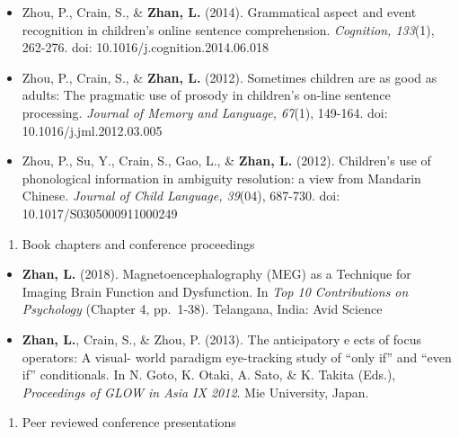 \documentclass[12pt,]{article}
\providecommand{\tightlist}{%
  \setlength{\itemsep}{0pt}\setlength{\parskip}{0pt}}
\begin{document}
\begin{itemize}
{  26}(7), 367-379. doi: 10.1080/20445911.2015.1016527
  \href{https://publications.likan.info/Periodicals/JCognPsychol2015.pdf}{
  \faFilePdf[regular] }
\item
  Zhou, P., Crain, S., \& \textbf{Zhan, L.} (2014). Grammatical aspect
  and event recognition in children's online sentence comprehension.
  \emph{Cognition, 133}(1), 262-276. doi:
  10.1016/j.cognition.2014.06.018
  \href{http://publications.likan.info/Periodicals/Cognition2014.pdf}{
  \faFilePdf[regular] }
\item
  Zhou, P., Crain, S., \& \textbf{Zhan, L.} (2012). Sometimes children
  are as good as adults: The pragmatic use of prosody in children's
  on-line sentence processing. \emph{Journal of Memory and Language,
  67}(1), 149-164. doi: 10.1016/j.jml.2012.03.005
  \href{https://publications.likan.info/Periodicals/JMemLang2012.pdf}{
  \faFilePdf[regular] }
\item
  Zhou, P., Su, Y., Crain, S., Gao, L., \& \textbf{Zhan, L.} (2012).
  Children's use of phonological information in ambiguity resolution: a
  view from Mandarin Chinese. \emph{Journal of Child Language, 39}(04),
  687-730. doi: 10.1017/S0305000911000249
  \href{https://publications.likan.info/Periodicals/JChildLang2012.pdf}{
  \faFilePdf[regular] }
\end{itemize}

\begin{enumerate}
\def\labelenumi{\arabic{enumi}.}
\setcounter{enumi}{2}
\tightlist
\item
  Book chapters and conference proceedings
\end{enumerate}

\begin{itemize}
\item
  \textbf{Zhan, L.} (2018). Magnetoencephalography (MEG) as a Technique
  for Imaging Brain Function and Dysfunction. In \emph{Top 10
  Contributions on Psychology} (Chapter 4, pp.~1-38). Telangana, India:
  Avid Science
\item
  \textbf{Zhan, L.}, Crain, S., \& Zhou, P. (2013). The anticipatory e
  ects of focus operators: A visual- world paradigm eye-tracking study
  of ``only if'' and ``even if'' conditionals. In N. Goto, K. Otaki, A.
  Sato, \& K. Takita (Eds.), \emph{Proceedings of GLOW in Asia IX 2012}.
  Mie University, Japan.
\end{itemize}

\begin{enumerate}
\def\labelenumi{\arabic{enumi}.}
\setcounter{enumi}{3}
\tightlist
\item
  Peer reviewed conference presentations
\end{enumerate}
\end{document}
